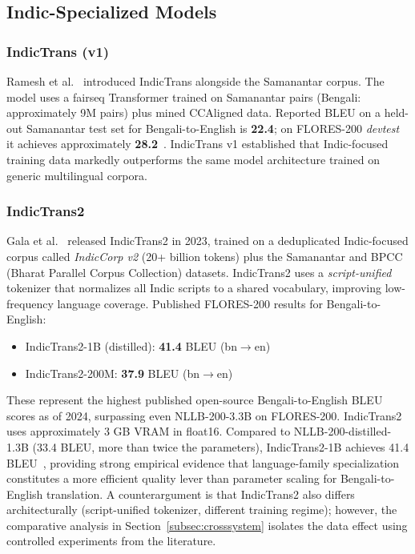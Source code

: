 \documentclass[conference]{IEEEtran}
\begin{document}
\subsection{Indic-Specialized Models}

\subsubsection{IndicTrans (v1)}
Ramesh et al.~\cite{ramesh2022samanantar} introduced IndicTrans alongside
the Samanantar corpus.
The model uses a fairseq Transformer trained on Samanantar pairs (Bengali:
approximately 9M pairs) plus mined CCAligned data.
Reported BLEU on a held-out Samanantar test set for Bengali-to-English is
\textbf{22.4}; on FLORES-200 \textit{devtest} it achieves approximately
\textbf{28.2}~\cite{gala2023indictrans2}.
IndicTrans v1 established that Indic-focused training data markedly
outperforms the same model architecture trained on generic multilingual
corpora.

\subsubsection{IndicTrans2}
Gala et al.~\cite{gala2023indictrans2} released IndicTrans2 in 2023,
trained on a deduplicated Indic-focused corpus called
\textit{IndicCorp v2} (20+ billion tokens) plus the Samanantar and
BPCC (Bharat Parallel Corpus Collection) datasets.
IndicTrans2 uses a \textit{script-unified} tokenizer that normalizes
all Indic scripts to a shared vocabulary, improving low-frequency
language coverage.
Published FLORES-200 results for Bengali-to-English:
\begin{itemize}
  \item IndicTrans2-1B (distilled): \textbf{41.4} BLEU (bn$\to$en)
  \item IndicTrans2-200M: \textbf{37.9} BLEU (bn$\to$en)
\end{itemize}
These represent the highest published open-source Bengali-to-English BLEU
scores as of 2024, surpassing even NLLB-200-3.3B on FLORES-200.
IndicTrans2 uses approximately 3 GB VRAM in float16.
Compared to NLLB-200-distilled-1.3B (33.4 BLEU, more than twice the parameters),
IndicTrans2-1B achieves 41.4 BLEU~\cite{gala2023indictrans2}, providing strong
empirical evidence that language-family specialization constitutes a more efficient
quality lever than parameter scaling for Bengali-to-English translation.
A counterargument is that IndicTrans2 also differs architecturally (script-unified
tokenizer, different training regime); however, the comparative analysis in
Section~\ref{subsec:crosssystem} isolates the data effect using controlled experiments
from the literature.
\end{document}
